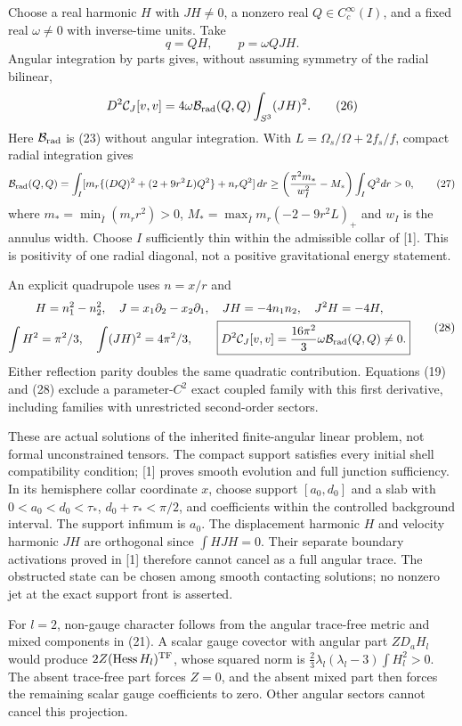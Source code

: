 \documentclass[
  10pt,
]{article}
\begin{document}
Choose a real harmonic \(H\) with \(JH\ne0\), a nonzero real
\(Q\in C_c^\infty(I)\), and a fixed real \(\omega\ne0\) with
inverse-time units. Take \[
 q=QH,\qquad p=\omega QJH .                              \tag{25}
\] Angular integration by parts gives, without assuming symmetry of the
radial bilinear, \[
 D^2\mathcal C_J[v,v]
 =4\omega\mathcal B_{\rm rad}(Q,Q)\int_{S^3}(JH)^2 .    \tag{26}
\] Here \(\mathcal B_{\rm rad}\) is (23) without angular integration.
With \(L=\Omega_s/\Omega+2f_s/f\), compact radial integration gives \[
 \mathcal B_{\rm rad}(Q,Q)
 =\int_I[m_r\{(DQ)^2+(2+9r^2L)Q^2\}+n_rQ^2]\,dr
 \ge\left(\frac{\pi^2m_*}{w_I^2}-M_*\right)\int_IQ^2dr>0,\tag{27}
\] where \(m_* =\min_{\bar I}(m_rr^2)>0\),
\(M_* =\max_{\bar I}m_r(-2-9r^2L)_+\) and \(w_I\) is the annulus width.
Choose \(I\) sufficiently thin within the admissible collar of {[}1{]}.
This is positivity of one radial diagonal, not a positive gravitational
energy statement.

An explicit quadrupole uses \(n=x/r\) and \[
 \begin{gathered}
 H=n_1^2-n_2^2,\quad J=x_1\partial_2-x_2\partial_1,
 \quad JH=-4n_1n_2,\quad J^2H=-4H,\\
 \int H^2=\pi^2/3,\quad\int(JH)^2=4\pi^2/3,\qquad
 \boxed{D^2\mathcal C_J[v,v]
       =\frac{16\pi^2}{3}\omega\mathcal B_{\rm rad}(Q,Q)\ne0.}
 \end{gathered}                                           \tag{28}
\] Either reflection parity doubles the same quadratic contribution.
Equations (19) and (28) exclude a parameter-\(C^2\) exact coupled family
with this first derivative, including families with unrestricted
second-order sectors.

These are actual solutions of the inherited finite-angular linear
problem, not formal unconstrained tensors. The compact support satisfies
every initial shell compatibility condition; {[}1{]} proves smooth
evolution and full junction sufficiency. In its hemisphere collar
coordinate \(x\), choose support \([a_0,d_0]\) and a slab with
\(0<a_0<d_0<\tau_*\), \(d_0+\tau_*<\pi/2\), and coefficients within the
controlled background interval. The support infimum is \(a_0\). The
displacement harmonic \(H\) and velocity harmonic \(JH\) are orthogonal
since \(\int HJH=0\). Their separate boundary activations proved in
{[}1{]} therefore cannot cancel as a full angular trace. The obstructed
state can be chosen among smooth contacting solutions; no nonzero jet at
the exact support front is asserted.

For \(l=2\), non-gauge character follows from the angular trace-free
metric and mixed components in (21). A scalar gauge covector with
angular part \(Z D_aH_l\) would produce
\(2Z(\operatorname{Hess}H_l)^{\rm TF}\), whose squared norm is
\(\tfrac23\lambda_l(\lambda_l-3)\int H_l^2>0\). The absent trace-free
part forces \(Z=0\), and the absent mixed part then forces the remaining
scalar gauge coefficients to zero. Other angular sectors cannot cancel
this projection.
\end{document}
